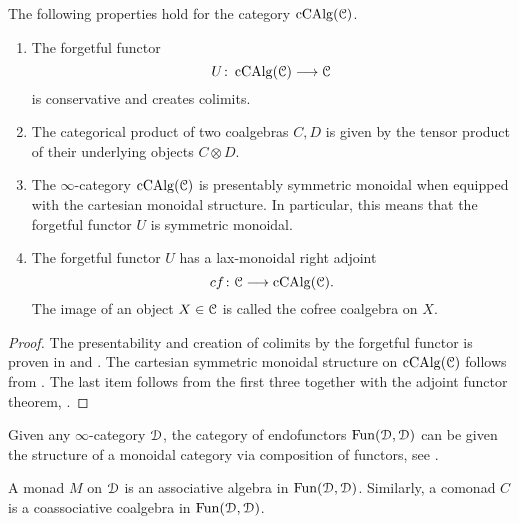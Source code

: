 \begin{proposition}
    The following properties hold for the category $\operatorname{cCAlg}(\EuScript{C})$. 
    \begin{enumerate}
        \item The forgetful functor 
        \[U\colon\operatorname{cCAlg}(\EuScript{C})\longrightarrow \EuScript{C}\] 
        is conservative and creates colimits. \label{ch2:prop:properties-coalgebras:item1}
        \item The categorical product of two coalgebras $C, D$ is given by the tensor product of their underlying objects $C\otimes D$. \label{ch2:prop:properties-coalgebras:item2}
        \item The $\infty$-category $\operatorname{cCAlg}(\EuScript{C})$ is presentably symmetric monoidal when equipped with the cartesian monoidal structure. In particular, this means that the forgetful functor $U$ is symmetric monoidal. \label{ch2:prop:properties-coalgebras:item3}
        \item The forgetful functor $U$ has a lax-monoidal right adjoint 
        \[cf\colon\EuScript{C}\longrightarrow\operatorname{cCAlg}(\EuScript{C}).\] 
        The image of an object $X\in \EuScript{C}$ is called the cofree coalgebra on $X$. \label{ch2:prop:properties-coalgebras:item4}
    \end{enumerate}
\end{proposition}
\begin{proof}
    The presentability and creation of colimits by the forgetful functor is proven in \cite[3.1.2]{lurie_2018_ELL1} and \cite[3.1.4]{lurie_2018_ELL1}. The cartesian symmetric monoidal structure on $\operatorname{cCAlg}(\EuScript{C})$ follows from \cite[3.2.4.7]{Lurie_HA}. The last item follows from the first three together with the adjoint functor theorem, \cite[5.5.2.9]{lurie_09}. 
\end{proof}



Given any $\infty$-category $\EuScript{D}$, the category of endofunctors $\operatorname{Fun}(\EuScript{D}, \EuScript{D})$ can be given the structure of a monoidal category via composition of functors, see \cite[1.15]{christ_2023}. 

\begin{definition}
    A monad $M$ on $\EuScript{D}$ is an associative algebra in $\operatorname{Fun}(\EuScript{D}, \EuScript{D})$. Similarly, a comonad $C$ is a coassociative coalgebra in $\operatorname{Fun}(\EuScript{D}, \EuScript{D})$. 
\end{definition}


